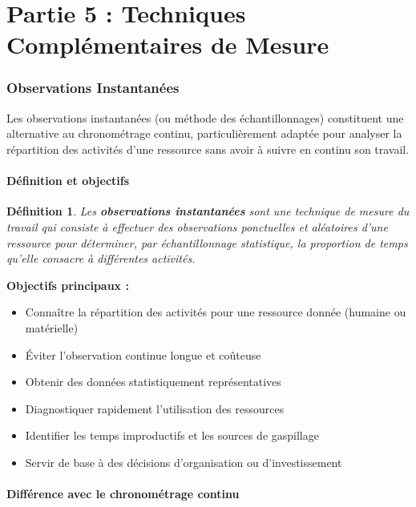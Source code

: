 \documentclass[a4paper,12pt]{article}
\newtheorem{definition}{Définition}[section]
\begin{document}
\part*{Partie 5 : Techniques Complémentaires de Mesure}

\section{Observations Instantanées}

Les observations instantanées (ou méthode des échantillonnages) constituent une alternative au chronométrage continu, particulièrement adaptée pour analyser la répartition des activités d'une ressource sans avoir à suivre en continu son travail.

\subsection{Définition et objectifs}

\begin{definition}
Les \textbf{observations instantanées} sont une technique de mesure du travail qui consiste à effectuer des observations ponctuelles et aléatoires d'une ressource pour déterminer, par échantillonnage statistique, la proportion de temps qu'elle consacre à différentes activités.
\end{definition}

\textbf{Objectifs principaux :}
\begin{itemize}
    \item Connaître la répartition des activités pour une ressource donnée (humaine ou matérielle)
    \item Éviter l'observation continue longue et coûteuse
    \item Obtenir des données statistiquement représentatives
    \item Diagnostiquer rapidement l'utilisation des ressources
    \item Identifier les temps improductifs et les sources de gaspillage
    \item Servir de base à des décisions d'organisation ou d'investissement
\end{itemize}

\subsection{Différence avec le chronométrage continu}
\end{document}
